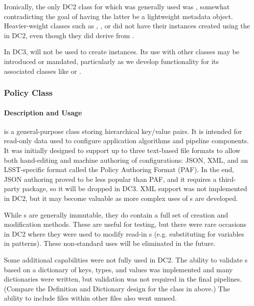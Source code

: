 Ironically, the only DC2 class for which  was generally
used was , somewhat contradicting the goal of having the
latter be a lightweight metadata object.  Heavier-weight classes such as
, , or  did not have their instances created using the
 in DC2, even though they did derive from .

In DC3,  will not be used to create 
instances.  Its use with other classes may be introduced or mandated,
particularly as we develop functionality for its associated classes
like  or .

\subsubsection{Policy Class}
\label{Policy}

\paragraph{Description and Usage}

 is a general-purpose class storing hierarchical key/value pairs.
It is intended for read-only data used to configure application
algorithms and pipeline components.  It was initially designed to
support up to three text-based file formats to allow both hand-editing
and machine authoring of configurations: JSON, XML, and an LSST-specific
format called the Policy Authoring Format (PAF).  In the end, JSON
authoring proved to be less popular than PAF, and it requires a
third-party package, so it will be dropped in DC3.  XML support was not
implemented in DC2, but it may become valuable as more complex uses of
s are developed.

While s are generally immutable, they do contain a full set of
creation and modification methods.  These are useful for testing, but
there were rare occasions in DC2 where they were used to modify read-in
s (e.g. substituting for variables in patterns).  These
non-standard uses will be eliminated in the future.

Some additional  capabilities were not fully used in DC2.  The
ability to validate s based on a dictionary of keys, types, and
values was implemented and many dictionaries were written, but
validation was not required in the final pipelines.  (Compare the
Definition and Dictionary design for the  class in
 above.)  The ability to include  files within
other  files also went unused.


